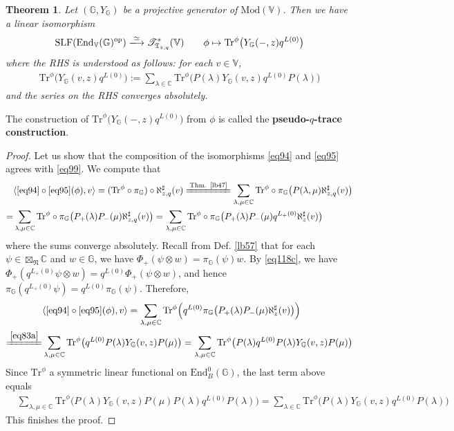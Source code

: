 \documentclass[11pt,b5paper,notitlepage]{article}
\theoremstyle{definition}
\theoremstyle{plain}
\newtheorem{thm}[df]{Theorem}
\newcommand{\fk}{\mathfrak}
\newcommand{\Tr}{\mathrm{Tr}}
\newcommand{\End}{\mathrm{End}} %
\newcommand{\opp}{\mathrm{op}}
\newcommand{\SLF}{\mathrm{SLF}}
\newcommand{\Vbb}{\mathbb V}
\newcommand{\Gbb}{\mathbb G}
\newcommand{\Cbb}{\mathbb C}
\newcommand{\<}{\left\langle}
\renewcommand{\>}{\right\rangle}
\newcommand{\ST}{\mathscr{T}}
\newcommand{\bk}[1]{\langle {#1}\rangle}
\newcommand{\Mod}{\mathrm{Mod}}
\newcommand{\fn}{\mathfrak{N}}
\numberwithin{equation}{section}
\begin{document}
\begin{thm}\label{lb68}
Let $(\Gbb,Y_\Gbb)$ be a projective generator of $\Mod(\Vbb)$. Then we have a linear isomorphism
\begin{gather}\label{eq99}
\SLF (\End_\Vbb(\Gbb)^\opp)\xlongrightarrow{\simeq} \ST_{\fk T_{z,q}}^*(\Vbb)\qquad\phi\mapsto \Tr^\phi\big(Y_\Gbb(-,z)q^{L(0)}\big)
\end{gather}
where the RHS is understood as follows: for each $v\in\Vbb$,
\begin{align*}
\Tr^\phi\big(Y_\Gbb(v,z)q^{L(0)}\big):=\sum_{\lambda\in\Cbb}\Tr^\phi\big(P(\lambda)Y_\Gbb(v,z)q^{L(0)}P(\lambda)\big)
\end{align*}
and the series on the RHS converges absolutely.
\end{thm}

The construction of $\Tr^\phi\big(Y_\Gbb(-,z)q^{L(0)}\big)$ from $\phi$ is called the \textbf{pseudo-$q$-trace construction}.

\begin{proof}
Let us show that the composition of the isomorphisms \eqref{eq94} and \eqref{eq95} agrees with \eqref{eq99}. We compute that
\begin{align*}
&\bk{\eqref{eq94}\circ\eqref{eq95}(\phi),v}=(\Tr^\phi\circ\pi_\Gbb)\circ\aleph^\sharp_{z,q}(v)\xlongequal{\text{Thm. \ref{lb47}}}\sum_{\lambda,\mu\in\Cbb}\Tr^\phi\circ\pi_\Gbb\big(P(\lambda,\mu)\aleph^\sharp_{z,q}(v)\big)\\
=&\sum_{\lambda,\mu\in\Cbb}\Tr^\phi\circ\pi_\Gbb\big(P_+(\lambda)P_-(\mu)\aleph^\sharp_{z,q}(v)\big)=\sum_{\lambda,\mu\in\Cbb}\Tr^\phi\circ\pi_\Gbb\big(P_+(\lambda)P_-(\mu)q^{L_+(0)}\aleph^\sharp_z(v)\big)
\end{align*}
where the sums converge absolutely. Recall from Def. \ref{lb57} that for each $\psi\in\boxtimes_\fn\Cbb$ and $w\in\Gbb$, we have $\Phi_+(\psi\otimes w)=\pi_\Gbb(\psi)w$. By \eqref{eq118c}, we have $\Phi_+(q^{L_+(0)}\psi\otimes w)=q^{L(0)}\Phi_+(\psi\otimes w)$, and hence $\pi_\Gbb(q^{L_+(0)}\psi)=q^{L(0)}\pi_\Gbb(\psi)$. Therefore,
\begin{align*}
&\bk{\eqref{eq94}\circ\eqref{eq95}(\phi),v}=\sum_{\lambda,\mu\in\Cbb}\Tr^\phi\Big( q^{L(0)}\pi_\Gbb\big(P_+(\lambda)P_-(\mu)\aleph^\sharp_z(v)\big)\Big)\\
\xlongequal{\eqref{eq83a}}&\sum_{\lambda,\mu\in\Cbb}\Tr^\phi\big(q^{L(0)} P(\lambda)Y_\Gbb(v,z)P(\mu)\big)=\sum_{\lambda,\mu\in\Cbb}\Tr^\phi\big(P(\lambda)q^{L(0)} P(\lambda)Y_\Gbb(v,z)P(\mu)\big)
\end{align*}
Since $\Tr^\phi$ a symmetric linear functional on $\End^0_B(\Gbb)$, the last term above equals
\begin{align*}
&\sum_{\lambda,\mu\in\Cbb}\Tr^\phi\big(P(\lambda)Y_\Gbb(v,z)P(\mu)P(\lambda)q^{L(0)} P(\lambda)\big)=\sum_{\lambda\in\Cbb}\Tr^\phi\big(P(\lambda)Y_\Gbb(v,z)q^{L(0)} P(\lambda)\big)
\end{align*}
This finishes the proof.
\end{proof}
\end{document}

